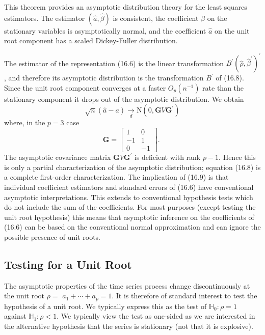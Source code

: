 \documentclass[10pt]{article}
\begin{document}
This theorem provides an asymptotic distribution theory for the least squares estimators. The estimator $(\widehat{a}, \widehat{\beta})$ is consistent, the coefficient $\widehat{\beta}$ on the stationary variables is asymptotically normal, and the coefficient $\widehat{a}$ on the unit root component has a scaled Dickey-Fuller distribution.

The estimator of the representation (16.6) is the linear transformation $B^{\prime}\left(\widehat{\rho}, \widehat{\beta}^{\prime}\right)^{\prime}$, and therefore its asymptotic distribution is the transformation $B^{\prime}$ of (16.8). Since the unit root component converges at a faster $O_{p}\left(n^{-1}\right)$ rate than the stationary component it drops out of the asymptotic distribution. We obtain
$$
\sqrt{n}(\widehat{a}-a) \underset{d}{\longrightarrow} \mathrm{N}\left(0, \boldsymbol{G} V \boldsymbol{G}^{\prime}\right)
$$
where, in the $p=3$ case
$$
\boldsymbol{G}=\left[\begin{array}{cc}
1 & 0 \\
-1 & 1 \\
0 & -1
\end{array}\right] \text {. }
$$
The asymptotic covariance matrix $\boldsymbol{G} V \boldsymbol{G}^{\prime}$ is deficient with rank $p-1$. Hence this is only a partial characterization of the asymptotic distribution; equation (16.8) is a complete first-order characterization. The implication of (16.9) is that individual coefficient estimators and standard errors of (16.6) have conventional asymptotic interpretations. This extends to conventional hypothesis tests which do not include the sum of the coefficients. For most purposes (except testing the unit root hypothesis) this means that asymptotic inference on the coefficients of (16.6) can be based on the conventional normal approximation and can ignore the possible presence of unit roots.

\subsection{Testing for a Unit Root}
The asymptotic properties of the time series process change discontinuously at the unit root $\rho=$ $a_{1}+\cdots+a_{p}=1$. It is therefore of standard interest to test the hypothesis of a unit root. We typically express this as the test of $\mathbb{H}_{0}: \rho=1$ against $\mathbb{H}_{1}: \rho<1$. We typically view the test as one-sided as we are interested in the alternative hypothesis that the series is stationary (not that it is explosive).
\end{document}

